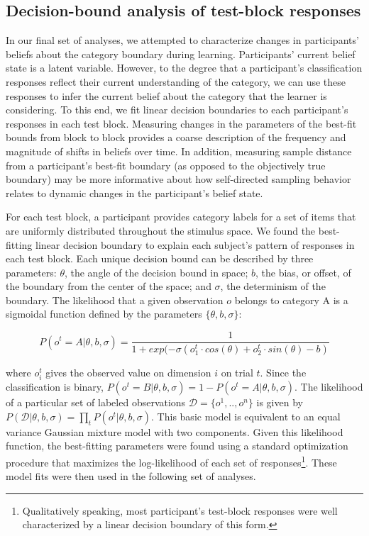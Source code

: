 \documentclass[3p,twocolumn,authoryear,10pt]{elsarticle}
\begin{document}
\subsection{Decision-bound analysis of test-block responses}  
In our final set of analyses, we attempted to characterize changes in participants' beliefs about the category boundary during learning.  Participants' current belief state is a latent variable.  However, to the degree that a participant's classification responses reflect their current understanding of the category, we can use these responses to infer the current belief about the category that the learner is considering. To this end, we fit linear decision boundaries to each participant's responses in each test block. Measuring changes in the parameters of the best-fit bounds from block to block provides a coarse description of the frequency and magnitude of shifts in beliefs over time. In addition, measuring sample distance from a participant's best-fit boundary (as opposed to the objectively true boundary) may be more informative about how self-directed sampling behavior relates to dynamic changes in the participant's belief state.

For each test block, a participant provides category labels for a set of items that are uniformly distributed throughout the stimulus space. We found the best-fitting linear decision boundary to explain each subject's pattern of responses in each test block.  Each unique decision bound can be described by three parameters: $\theta$, the angle of the decision bound in space; $b$, the bias, or offset, of the boundary from the center of the space; and $\sigma$, the determinism of the boundary. The likelihood that a given observation $o$ belongs to category A is a sigmoidal function defined by the parameters $\{\theta, b, \sigma\}$:

\begin{small}
\begin{equation}
P(o^t=A |  \theta, b, \sigma) = \frac{1}{1 + exp(-\sigma (o_1^t \cdot cos(\theta) + o_2^t \cdot sin(\theta)-b)}
\label{likelihood.eq}
\end{equation}
\end{small}

\noindent
where $o_i^t$ gives the observed value on dimension $i$ on trial $t$. Since the classification is binary, $P(o^t=B|  \theta, b, \sigma) = 1-P(o^t=A | \theta, b, \sigma)$. The likelihood of a particular set of labeled observations $\mathcal{D}=\{o^1, .., o^{n}\}$ is given by $P(\mathcal{D}|\theta,b,\sigma) = \prod_t P(o^t | \theta,b,\sigma)$. This basic model is equivalent to an equal variance Gaussian mixture model with two components. Given this likelihood function, the best-fitting parameters were found using a standard optimization procedure that maximizes the log-likelihood of each set of responses\footnote{Qualitatively speaking, most participant's test-block responses were well characterized by a linear decision boundary of this form.}.  These model fits were then used in the following set of analyses.\\
\end{document}
